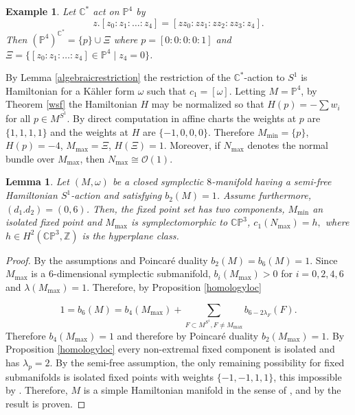 \documentclass[12pt]{article}
\newtheorem{lemma}[theorem]{Lemma}
\newtheorem{example}[theorem]{Example}
\begin{document}
\begin{example} \label{projectiveone}
Let $\mathbb{C}^*$ act on $\mathbb{P}^4$ by $$z.[z_0:z_1:\ldots:z_4] = [zz_0:zz_1: z z_2:z z_3: z_4] .$$  Then  $(\mathbb{P}^4)^{\mathbb{C}^*} = \{p\} \cup \Xi$ where $p= [0:0:0:0:1]$ and $\Xi = \{[z_0:z_1:\ldots:z_4] \in \mathbb{P}^4 \mid  z_4=0\}$.
\end{example}
 By Lemma  \ref{algebraicrestriction} the restriction of the $\mathbb{C}^*$-action to $S^1$ is Hamiltonian for a K\"{a}hler form $\omega$ such that $c_1 = [\omega]$. Letting $M=\mathbb{P}^4$, by Theorem \ref{wsf} the Hamiltonian $H$ may be normalized so that $H(p) =- \sum w_i$ for all $p \in M^{S^1}$. By direct computation in affine charts the weights at $p$ are $\{1,1,1,1\}$ and the weights at $H$ are $\{-1,0,0,0\}$. Therefore $M_{\min}=\{p\}$, $H(p)=-4$, $M_{\max}=\Xi$, $H(\Xi)=1$. Moreover, if $N_{\max}$ denotes the normal bundle over $M_{\max}$, then $N_{\max} \cong \mathcal{O}(1)$.

\begin{lemma} \label{zerosixcase}
Let $(M,\omega)$ be a closed symplectic $8$-manifold having a semi-free Hamiltonian $S^1$-action and satisfying $b_{2}(M)=1$. Assume furthermore, $(d_1.d_{2}) = (0,6)$. Then, the fixed point set has two components, $M_{\min}$ an isolated fixed point and $M_{\max}$ is symplectomorphic to $\mathbb{CP}^3$, $c_{1}(N_{\max}) = h,$ where $h \in H^{2}(\mathbb{CP}^3,\mathbb{Z})$ is the hyperplane class.
\end{lemma}
\begin{proof}
 By the assumptions and Poincar\'{e} duality $b_{2}(M)=b_{6}(M)=1$. Since $M_{\max}$ is a $6$-dimensional symplectic submanifold, $b_{i}(M_{\max}) >0$ for $i=0,2,4,6$ and $\lambda(M_{\max}) = 1$. Therefore, by Proposition \ref{homologyloc} 

\begin{equation} 
1= b_{6}(M) = b_{4}(M_{\max}) +  \sum_{F \subset M^{S^1}, F \neq M_{\max}} b_{6-2\lambda_{F}}(F).  \end{equation} Therefore $b_{4}(M_{\max})=1$ and therefore by Poincar\'{e} duality $b_{2}(M_{\max})=1$. By Proposition \ref{homologyloc} every non-extremal fixed component is isolated and has $\lambda_{p}=2$. By the semi-free assumption, the only remaining possibility for fixed submanifolds is isolated fixed points with weights $\{-1,-1,1,1\}$, this impossible by \cite[Lemma 3.1]{T}. Therefore, $M$ is a simple Hamiltonian manifold in the sense of \cite[Definition 1.1]{HH}, and by \cite[Corollary 6.5]{HH} the result is proven. \end{proof}
\end{document}
